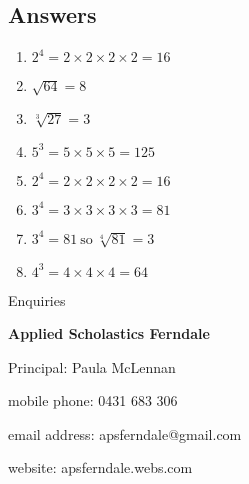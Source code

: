 \documentclass{article}
\begin{document}
\begin{spacing}{1.25}
\pagebreak

\subsection*{Answers}

\begin{enumerate}
\item $2^4 = 2 \times 2 \times 2 \times 2 = 16$\\
\item $\sqrt{64} = 8$\\
\item $\sqrt[3]{27} = 3$\\
\item $5^3 = 5 \times 5 \times 5 = 125$\\
\item $2^4 = 2 \times 2 \times 2 \times 2 = 16$\\
\item $3^4 = 3 \times 3 \times 3 \times 3 = 81$\\
\item $3^4 = 81\ \text{so}\ \sqrt[4]{81} = 3$\\
\item $4^3 = 4 \times 4 \times 4 = 64$
\end{enumerate}

\pagebreak

\doublespacing

\begin{center}

Enquiries

\textbf{Applied Scholastics Ferndale}

Principal: Paula McLennan

mobile phone: 0431 683 306

email address: apsferndale@gmail.com

website: apsferndale.webs.com
\end{center}

\end{spacing}
\end{document}
